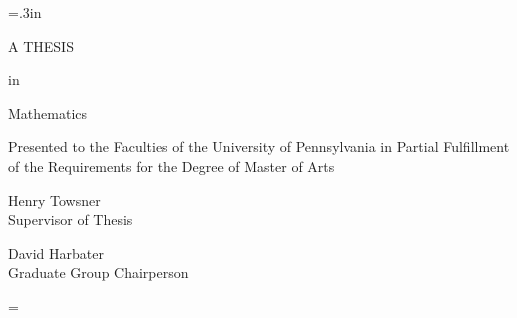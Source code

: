 \large\newlength{\oldparskip}\setlength\oldparskip{\parskip}\parskip=.3in
\thispagestyle{empty} \doublespaced
\begin{center}
\vspace*{\fill} \thetitle

\theauthor


A THESIS

in

Mathematics

\singlespaced

\large Presented to the Faculties of the University of
Pennsylvania in Partial
 Fulfillment of the Requirements for the Degree of Master of
 Arts
 
\doublespaced

\large
\theyear
\end{center}

\singlespaced

\noindent\makebox[0in][l]{\rule[2ex]{3in}{.3mm}}
 Henry Towsner \\  \hspace*{.5mm} Supervisor of Thesis

\noindent\makebox[0in][l]{\rule[2ex]{3in}{.3mm}}  David Harbater \\  \hspace*{.5mm} Graduate Group Chairperson \vspace*{\fill}

\normalsize\parskip=\oldparskip

\doublespaced

